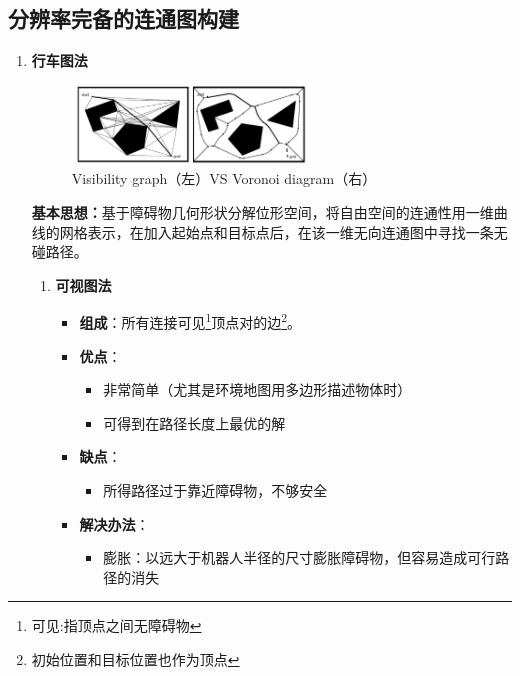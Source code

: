 \documentclass[../main.tex]{subfiles}
\begin{document}
\subsection{分辨率完备的连通图构建}\label{subsec:resolution_complete}
\begin{enumerate}
    \item \textbf{行车图法}\label{item:res:roadmap}
        \begin{figure}[H]
            \centering
            \includegraphics[width=0.6\textwidth]{images/xingchetu.png}
            \caption{Visibility graph（左）VS Voronoi diagram（右）}
        \end{figure}
        \textbf{基本思想：}基于障碍物几何形状分解位形空间，将自由空间的连通性用一维曲线的网格表示，在加入起始点和目标点后，在该一维无向连通图中寻找一条无碰路径。
        \begin{enumerate}
            \item \textbf{可视图法}\label{item:res:visibility}
                \begin{itemize}
                    \item \textbf{组成}：所有连接可见\footnote{可见:指顶点之间无障碍物}顶点对的边\footnote{初始位置和目标位置也作为顶点}。
                    \item \textbf{优点}：
                        \begin{itemize}
                            \item 非常简单（尤其是环境地图用多边形描述物体时）
                            \item 可得到在路径长度上最优的解
                        \end{itemize}
                    \item \textbf{缺点}：
                        \begin{itemize}
                            \item 所得路径过于靠近障碍物，不够安全
                        \end{itemize}
                    \item \textbf{解决办法}：
                        \begin{itemize}
                            \item 膨胀：以远大于机器人半径的尺寸膨胀障碍物，但容易造成可行路径的消失

\end{itemize}
\end{itemize}
\end{enumerate}
\end{enumerate}
\end{document}
